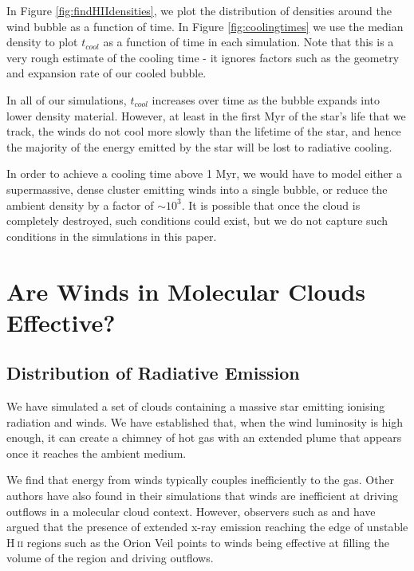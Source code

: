 \documentclass[a4paper,fleqn,usenatbib]{mnras}
\newcommand{\HII}{H$~$\textsc{ii}\xspace}
\begin{document}
 In Figure \ref{fig:findHIIdensities}, we plot the distribution of densities around the wind bubble as a function of time. In Figure \ref{fig:coolingtimes} we use the median density to plot $t_{cool}$ as a function of time in each simulation. Note that this is a very rough estimate of the cooling time - it ignores factors such as the geometry and expansion rate of our cooled bubble.
 
 In all of our simulations, $t_{cool}$ increases over time as the bubble expands into lower density material. However, at least in the first Myr of the star's life that we track, the winds do not cool more slowly than the lifetime of the star, and hence the majority of the energy emitted by the star will be lost to radiative cooling.
 
 In order to achieve a cooling time above 1 Myr, we would have to model either a supermassive, dense cluster emitting winds into a single bubble, or reduce the ambient density by a factor of $\sim 10^3$. It is possible that once the cloud is completely destroyed, such conditions could exist, but we do not capture such conditions in the simulations in this paper.

\section{Are Winds in Molecular Clouds Effective?}
\label{effective}

\subsection{Distribution of Radiative Emission}
\label{effective:radiativeemission}

We have simulated a set of clouds containing a massive star emitting ionising radiation and winds. We have established that, when the wind luminosity is high enough, it can create a chimney of hot gas with an extended plume that appears once it reaches the ambient medium. 

We find that energy from winds typically couples inefficiently to the gas. Other authors have also found in their simulations that winds are inefficient at driving outflows in a molecular cloud context. However, observers such as \cite{Guedel2007} and \cite{Pabst2019} have argued that the presence of extended x-ray emission reaching the edge of unstable \HII regions such as the Orion Veil points to winds being effective at filling the volume of the region and driving outflows.
\end{document}
